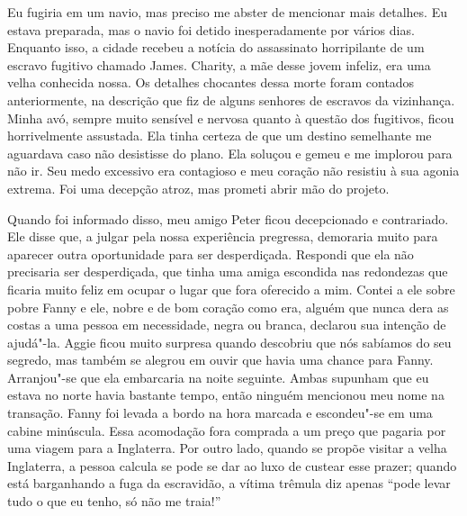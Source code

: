 Eu fugiria em um navio, mas preciso me
abster de mencionar mais detalhes. Eu estava preparada, mas o navio foi
detido inesperadamente por vários dias. Enquanto isso, a cidade recebeu
a notícia do assassinato horripilante de um escravo fugitivo chamado
James. Charity, a mãe desse jovem infeliz, era uma velha conhecida
nossa. Os detalhes chocantes dessa morte foram contados anteriormente,
na descrição que fiz de alguns senhores de escravos da vizinhança. Minha
avó, sempre muito sensível e nervosa quanto à questão dos fugitivos,
ficou horrivelmente assustada. Ela tinha certeza de que um destino
semelhante me aguardava caso não desistisse do plano. Ela soluçou e
gemeu e me implorou para não ir. Seu medo excessivo era contagioso e meu
coração não resistiu à sua agonia extrema. Foi uma decepção atroz, mas
prometi abrir mão do projeto.

Quando foi informado disso, meu amigo
Peter ficou decepcionado e contrariado. Ele disse que, a julgar pela
nossa experiência pregressa, demoraria muito para aparecer outra
oportunidade para ser desperdiçada. Respondi que ela não precisaria ser
desperdiçada, que tinha uma amiga escondida nas redondezas que ficaria
muito feliz em ocupar o lugar que fora oferecido a mim. Contei a ele
sobre pobre Fanny e ele, nobre e de bom coração como era, alguém que
nunca dera as costas a uma pessoa em necessidade, negra ou branca,
declarou sua intenção de ajudá"-la. Aggie ficou muito surpresa quando
descobriu que nós sabíamos do seu segredo, mas também se alegrou em
ouvir que havia uma chance para Fanny. Arranjou"-se que ela embarcaria na
noite seguinte. Ambas supunham que eu estava no norte havia bastante
tempo, então ninguém mencionou meu nome na transação. Fanny foi levada a
bordo na hora marcada e escondeu"-se em uma cabine minúscula. Essa
acomodação fora comprada a um preço que pagaria por uma viagem para a
Inglaterra. Por outro lado, quando se propõe visitar a velha Inglaterra,
a pessoa calcula se pode se dar ao luxo de custear esse prazer; quando
está barganhando a fuga da escravidão, a vítima trêmula diz apenas
``pode levar tudo o que eu tenho, só não me traia!''

